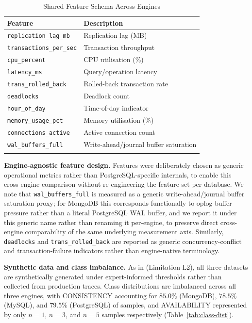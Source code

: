\documentclass[iicol,pdflatex,sn-mathphys-num]{sn-jnl}
\theoremstyle{thmstyleone}
\theoremstyle{thmstylethree}
\begin{document}
\begin{table}[h]
\caption{Shared Feature Schema Across Engines}\label{tab:features}
\setlength{\tabcolsep}{8pt}
\begin{tabular}{@{}lp{31mm}@{}}
\toprule
Feature & Description \\
\midrule
\texttt{replication\_lag\_mb} & Replication lag (MB) \\
\texttt{transactions\_per\_sec} & Transaction throughput \\
\texttt{cpu\_percent} & CPU utilisation (\%) \\
\texttt{latency\_ms} & Query/operation latency \\
\texttt{trans\_rolled\_back} & Rolled-back transaction rate \\
\texttt{deadlocks} & Deadlock count \\
\texttt{hour\_of\_day} & Time-of-day indicator \\
\texttt{memory\_usage\_pct} & Memory utilisation (\%) \\
\texttt{connections\_active} & Active connection count \\
\texttt{wal\_buffers\_full} & Write-ahead/journal buffer saturation \\
\botrule
\end{tabular}
\end{table}

\textbf{Engine-agnostic feature design.} Features were deliberately
chosen as generic operational metrics rather than PostgreSQL-specific
internals, to enable this cross-engine comparison without
re-engineering the feature set per database. We note that
\texttt{wal\_buffers\_full} is measured as a generic write-ahead/journal
buffer saturation proxy; for MongoDB this corresponds functionally to
oplog buffer pressure rather than a literal PostgreSQL WAL buffer, and
we report it under this generic name rather than renaming it
per-engine, to preserve direct cross-engine comparability of the same
underlying measurement axis. Similarly, \texttt{deadlocks} and
\texttt{trans\_rolled\_back} are reported as generic
concurrency-conflict and transaction-failure indicators rather than
engine-native terminology.

\textbf{Synthetic data and class imbalance.} As in \cite{iaha2026}
(Limitation L2), all three datasets are synthetically generated under
expert-informed thresholds rather than collected from production
traces. Class distributions are imbalanced across all three engines,
with CONSISTENCY accounting for $85.0\%$ (MongoDB), $78.5\%$ (MySQL),
and $79.5\%$ (PostgreSQL) of samples, and AVAILABILITY represented by
only $n=1$, $n=3$, and $n=5$ samples respectively
(Table~\ref{tab:class-dist}).
\end{document}
